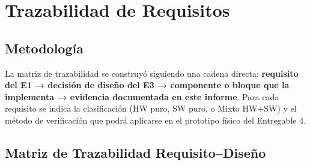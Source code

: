 \chapter{Trazabilidad de Requisitos}
\label{chap:trazabilidad}

\section{Metodología}
\label{sec:traz_metodologia}

La matriz de trazabilidad se construyó siguiendo una cadena directa: \textbf{requisito del E1 → decisión de diseño del E3 → componente o bloque que la implementa → evidencia documentada en este informe}. Para cada requisito se indica la clasificación (HW puro, SW puro, o Mixto HW+SW) y el método de verificación que podrá aplicarse en el prototipo físico del Entregable 4.

\section{Matriz de Trazabilidad Requisito--Diseño}
\label{sec:traz_matriz}

